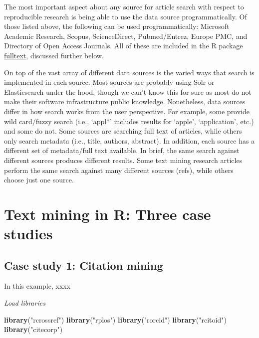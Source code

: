 \documentclass[author-year, review, 11pt]{components/elsarticle} %
\newenvironment{Shaded}{\begin{snugshade}}{\end{snugshade}}
\newcommand{\KeywordTok}[1]{\textcolor[rgb]{0.13,0.29,0.53}{\textbf{#1}}}
\newcommand{\NormalTok}[1]{#1}
\newcommand{\StringTok}[1]{\textcolor[rgb]{0.31,0.60,0.02}{#1}}
\begin{document}
The most important aspect about any source for article search with
respect to reproducible research is being able to use the data source
programmatically. Of those listed above, the following can be used
programmatically: Microsoft Academic Research, Scopus, ScienceDirect,
Pubmed/Entrez, Europe PMC, and Directory of Open Access Journals. All of
these are included in the R package
\href{https://github.com/ropensci/fulltext}{fulltext}, discussed further
below.

On top of the vast array of different data sources is the varied ways
that search is implemented in each source. Most sources are probably
using Solr or Elasticsearch under the hood, though we can't know this
for sure as most do not make their software infrastructure public
knowledge. Nonetheless, data sources differ in how search works from the
user perspective. For example, some provide wild card/fuzzy search
(i.e., `appl*' includes results for `apple', `application', etc.) and
some do not. Some sources are searching full text of articles, while
others only search metadata (i.e., title, authors, abstract). In
addition, each source has a different set of metadata/full text
available. In brief, the same search against different sources produces
different results. Some text mining research articles perform the same
search against many different sources (refs), while others choose just
one source.

\hypertarget{text-mining-in-r-three-case-studies}{%
\section{Text mining in R: Three case
studies}\label{text-mining-in-r-three-case-studies}}

\hypertarget{case-study-1-citation-mining}{%
\subsection{Case study 1: Citation
mining}\label{case-study-1-citation-mining}}

In this example, xxxx

\emph{Load libraries}

\begin{Shaded}
\begin{Highlighting}[]
\KeywordTok{library}\NormalTok{(}\StringTok{"rcrossref"}\NormalTok{)}
\KeywordTok{library}\NormalTok{(}\StringTok{"rplos"}\NormalTok{)}
\KeywordTok{library}\NormalTok{(}\StringTok{"rorcid"}\NormalTok{)}
\KeywordTok{library}\NormalTok{(}\StringTok{"rcitoid"}\NormalTok{)}
\KeywordTok{library}\NormalTok{(}\StringTok{"citecorp"}\NormalTok{)}
\end{Highlighting}
\end{Shaded}
\end{document}
